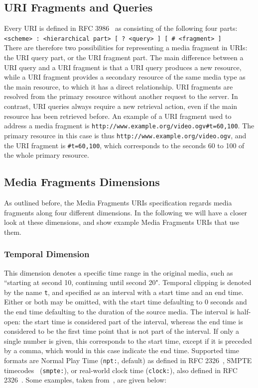 \documentclass[12pt]{article}
\begin{document}
\subsection{URI Fragments and Queries}
Every URI is defined in RFC 3986~\cite{bernerslee2005uri} as consisting of the following four parts:\\

\noindent  \texttt{<scheme> : <hierarchical part> [ ? <query> ] [ \# <fragment> ]}\\

\noindent  There are therefore two possibilities for representing a media fragment in URIs: the URI query part, or the URI fragment part. The main difference between a URI query and a URI fragment is that a URI query produces a new resource, while a URI fragment provides a secondary resource of the same media type as the main resource, to which it has a direct relationship. URI fragments are resolved from the primary resource without another request to the server. In contrast, URI queries always require a new retrieval action, even if the main resource has been retrieved before. An example of a URI fragment used to address a media fragment is \texttt{http://www.example.org/video.ogv\-\#t=60,100}. The primary resource in this case is thus \texttt{http://www.ex\-ample.org/video.ogv}, and the URI fragment is \texttt{\#t=60,100}, which corresponds to the seconds 60 to 100 of the whole primary resource.

\subsection{Media Fragments Dimensions}
As outlined before, the Media Fragments URIs specification regards media fragments along four different dimensions. In the following we will have a closer look at these dimensions, and show example Media Fragments URIs that use them.

\subsubsection{Temporal Dimension}
This dimension denotes a specific time range in the original media, such as ``starting at second 10, continuing until second 20". Temporal clipping is denoted by the name \texttt{t}, and specified as an interval with a start time and an end time. Either or both may be omitted, with the start time defaulting to 0 seconds and the end time defaulting to the duration of the source media. The interval is half-open: the start time is considered part of the interval, whereas the end time is considered to be the first time point that is not part of the interval. If only a single number is given, this corresponds to the start time, except if it is preceded by a comma, which would in this case indicate the end time. Supported time formats are Normal Play Time (\texttt{npt:}, default) as defined in RFC 2326~\cite{rfc2326}, SMPTE timecodes~\cite{smpte} (\texttt{smpte:}), or real-world clock time (\texttt{clock:}), also defined in RFC 2326~\cite{rfc2326}. Some examples, taken from~\cite{W3C:MediaFrags}, are given below:\\
\end{document}
